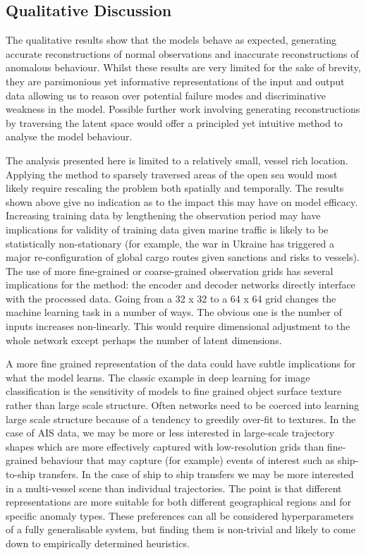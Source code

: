 \documentclass{mldsmsc}
\begin{document}
\subsection{Qualitative Discussion}
The qualitative results show that the models behave as expected, generating accurate reconstructions of normal observations and inaccurate reconstructions of anomalous behaviour. Whilst these results are very limited for the sake of brevity, they are parsimonious yet informative representations of the input and output data allowing us to reason over potential failure modes and discriminative weakness in the model. Possible further work involving generating reconstructions by traversing the latent space would offer a principled yet intuitive method to analyse the model behaviour.

The analysis presented here is limited to a relatively small, vessel rich location. Applying the method to sparsely traversed areas of the open sea would most likely require rescaling the problem both spatially and temporally. The results shown above give no indication as to the impact this may have on model efficacy. Increasing training data by lengthening the observation period may have implications for validity of training data given marine traffic is likely to be statistically non-stationary (for example, the war in Ukraine has triggered a major re-configuration of global cargo routes given sanctions and risks to vessels). The use of more fine-grained or coarse-grained observation grids has several implications for the method: the encoder and decoder networks directly interface with the processed data. Going from a 32 x 32 to a 64 x 64 grid changes the machine learning task in a number of ways. The obvious one is the number of inputs increases non-linearly. This would require dimensional adjustment to the whole network except perhaps the number of latent dimensions. 

A more fine grained representation of the data could have subtle implications for what the model learns. The classic example in deep learning for image classification is the sensitivity of models to fine grained object surface texture rather than large scale structure. Often networks need to be coerced into learning large scale structure because of a tendency to  greedily over-fit to textures. In the case of AIS data, we may be more or less interested in large-scale trajectory shapes which are more effectively captured with low-resolution grids than fine-grained behaviour that may capture (for example) events of interest such as ship-to-ship transfers. In the case of ship to ship transfers we may be more interested in a  multi-vessel scene than individual trajectories. The point is that different representations are more suitable for both different geographical  regions and for specific anomaly types. These preferences can all be considered hyperparameters of a fully generalisable system, but finding them is non-trivial and likely to come down to empirically determined heuristics. 
\end{document}
